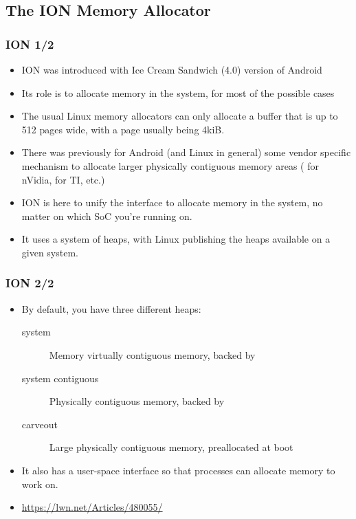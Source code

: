 \subsection{The ION Memory Allocator}
\begin{frame}
  \frametitle{ION 1/2}
  \begin{itemize}
  \item ION was introduced with Ice Cream Sandwich (4.0) version of
    Android
  \item Its role is to allocate memory in the system, for most of the
    possible cases
  \item The usual Linux memory allocators can only allocate a buffer
    that is up to 512 pages wide, with a page usually being 4kiB.
  \item There was previously for Android (and Linux in general) some
    vendor specific mechanism to allocate larger physically contiguous
    memory areas ( for nVidia,  for TI, etc.)
  \item ION is here to unify the interface to allocate memory in the
    system, no matter on which SoC you're running on.
  \item It uses a system of heaps, with Linux publishing the heaps
    available on a given system.
  \end{itemize}
\end{frame}

\begin{frame}
  \frametitle{ION 2/2}
  \begin{itemize}
  \item By default, you have three different heaps:
    \begin{description}
    \item[system] Memory virtually contiguous memory, backed by
    \item[system contiguous] Physically contiguous memory, backed by
    \item[carveout] Large physically contiguous memory, preallocated
      at boot
    \end{description}
  \item It also has a user-space interface so that processes can
    allocate memory to work on.
  \item \url{https://lwn.net/Articles/480055/}
  \end{itemize}
\end{frame}
